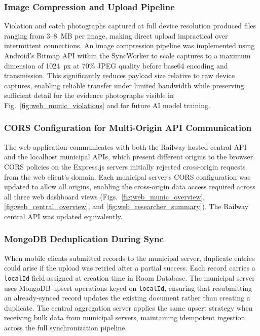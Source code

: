 \documentclass{icsthesis}
\begin{document}
\begin{mainmatter}
\subsubsection{Image Compression and Upload Pipeline}

Violation and catch photographs captured at full device resolution produced files ranging
from 3--8~MB per image, making direct upload impractical over intermittent connections.
An image compression pipeline was implemented using Android's Bitmap API within the
SyncWorker to scale captures to a maximum dimension of 1024~px at 70\% JPEG quality
before base64 encoding and transmission. This significantly reduces payload size relative
to raw device captures, enabling reliable transfer under limited bandwidth while
preserving sufficient detail for the evidence photographs visible in
Fig.~\ref{fig:web_munic_violations} and for future AI model training.

\subsubsection{CORS Configuration for Multi-Origin API Communication}

The web application communicates with both the Railway-hosted central API and the
localhost municipal APIs, which present different origins to the browser. CORS policies
on the Express.js servers initially rejected cross-origin requests from the web client's
domain. Each municipal server's CORS configuration was updated to allow all origins,
enabling the cross-origin data access required across all three web dashboard views
(Figs.~\ref{fig:web_munic_overview}, \ref{fig:web_central_overview},
and \ref{fig:web_researcher_summary}). The Railway central API was updated
equivalently.

\subsubsection{MongoDB Deduplication During Sync}

When mobile clients submitted records to the municipal server, duplicate entries could
arise if the upload was retried after a partial success. Each record carries a
\texttt{localId} field assigned at creation time in Room Database. The municipal server
uses MongoDB upsert operations keyed on \texttt{localId}, ensuring that resubmitting an
already-synced record updates the existing document rather than creating a duplicate.
The central aggregation server applies the same upsert strategy when receiving bulk data
from municipal servers, maintaining idempotent ingestion across the full synchronization
pipeline.


\end{mainmatter}
\end{document}
